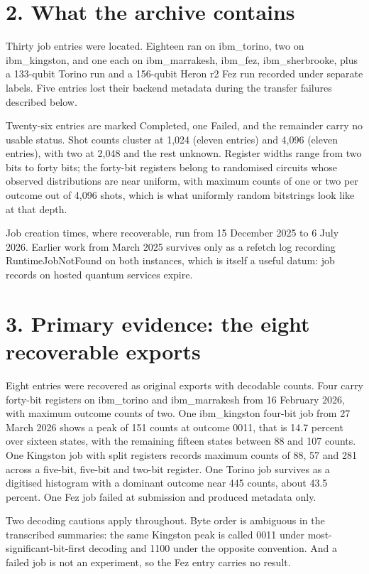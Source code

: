 \documentclass[11pt]{article}
\begin{document}
\section*{2. What the archive contains}
Thirty job entries were located. Eighteen ran on ibm\_torino, two on ibm\_kingston, and one each on ibm\_marrakesh, ibm\_fez, ibm\_sherbrooke, plus a 133-qubit Torino run and a 156-qubit Heron r2 Fez run recorded under separate labels. Five entries lost their backend metadata during the transfer failures described below.

Twenty-six entries are marked Completed, one Failed, and the remainder carry no usable status. Shot counts cluster at 1,024 (eleven entries) and 4,096 (eleven entries), with two at 2,048 and the rest unknown. Register widths range from two bits to forty bits; the forty-bit registers belong to randomised circuits whose observed distributions are near uniform, with maximum counts of one or two per outcome out of 4,096 shots, which is what uniformly random bitstrings look like at that depth.

Job creation times, where recoverable, run from 15 December 2025 to 6 July 2026. Earlier work from March 2025 survives only as a refetch log recording RuntimeJobNotFound on both instances, which is itself a useful datum: job records on hosted quantum services expire.

\section*{3. Primary evidence: the eight recoverable exports}
Eight entries were recovered as original exports with decodable counts. Four carry forty-bit registers on ibm\_torino and ibm\_marrakesh from 16 February 2026, with maximum outcome counts of two. One ibm\_kingston four-bit job from 27 March 2026 shows a peak of 151 counts at outcome 0011, that is 14.7 percent over sixteen states, with the remaining fifteen states between 88 and 107 counts. One Kingston job with split registers records maximum counts of 88, 57 and 281 across a five-bit, five-bit and two-bit register. One Torino job survives as a digitised histogram with a dominant outcome near 445 counts, about 43.5 percent. One Fez job failed at submission and produced metadata only.

Two decoding cautions apply throughout. Byte order is ambiguous in the transcribed summaries: the same Kingston peak is called 0011 under most-significant-bit-first decoding and 1100 under the opposite convention. And a failed job is not an experiment, so the Fez entry carries no result.
\end{document}
